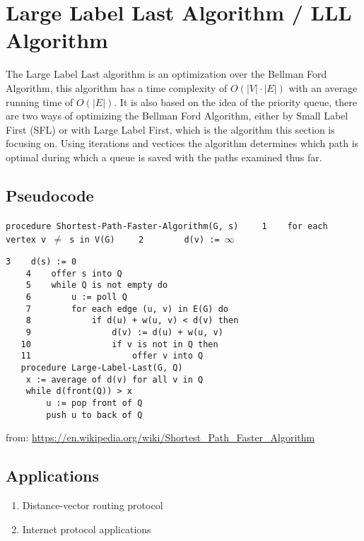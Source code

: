 \documentclass{article}
\begin{document}
\section{Large Label Last Algorithm / LLL Algorithm}
The Large Label Last algorithm is an optimization over the Bellman Ford Algorithm, this algorithm has a time complexity of $O(\left| V \right| \cdot \left| E \right|)$ with an average running time of $O(\left| E \right| )$. It is also based on the idea of the priority queue, there are two ways of optimizing the Bellman Ford Algorithm, either by Small Label First (SFL) or with Large Label First, which is the algorithm this section is focusing on. Using iterations and vectices the algorithm determines which path is optimal during which a queue is saved with the paths examined thus far.

\subsection{Pseudocode}
\verb|procedure Shortest-Path-Faster-Algorithm(G, s)| \newline 
\verb|    1    for each vertex v |$\neq$\verb| s in V(G)|\newline  
\verb|    2        d(v) := |$\infty $ 
\begin{Verbatim}[breaklines=true, breakanywhere=true]
    3    d(s) := 0
    4    offer s into Q
    5    while Q is not empty do
    6        u := poll Q
    7        for each edge (u, v) in E(G) do
    8            if d(u) + w(u, v) < d(v) then
    9                d(v) := d(u) + w(u, v)
   10                if v is not in Q then
   11                    offer v into Q
   procedure Large-Label-Last(G, Q)
    x := average of d(v) for all v in Q
    while d(front(Q)) > x
        u := pop front of Q
        push u to back of Q

\end{Verbatim}
from: \url{https://en.wikipedia.org/wiki/Shortest_Path_Faster_Algorithm}

\subsection{Applications}
\begin{enumerate}
    \item Distance-vector routing protocol 
    \item Internet protocol applications
\end{enumerate}
\end{document}
